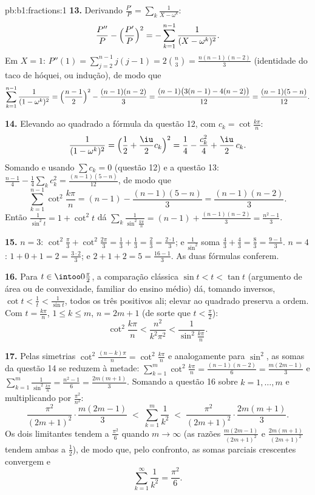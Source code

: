 \begin{solution}{pb:b1:fractions:1}
\textbf{13.} Derivando $\frac{P'}P = \sum_k\frac1{X -
\omega^k}$:
\[
\frac{P''}P - \Bigl(\frac{P'}P\Bigr)^2
= -\sum_{k=1}^{n-1}\frac1{(X - \omega^k)^2} .
\]
Em $X = 1$: $P''(1) = \sum_{j=2}^{n-1}j(j-1) = 2\binom n3 =
\frac{n(n-1)(n-2)}3$ (identidade do taco de hóquei, ou indução), de modo que
\[
\sum_{k=1}^{n-1}\frac1{(1 - \omega^k)^2}
= \Bigl(\frac{n-1}2\Bigr)^2 - \frac{(n-1)(n-2)}3
= \frac{(n-1)\bigl(3(n-1) - 4(n-2)\bigr)}{12}
= \frac{(n-1)(5-n)}{12} .
\]

\textbf{14.} Elevando ao quadrado a fórmula da questão 12, com $c_k =
\cot\frac{k\pi}n$:
\[
\frac1{(1-\omega^k)^2}
= \Bigl(\frac12 + \frac\iu2 c_k\Bigr)^2
= \frac14 - \frac{c_k^2}4 + \frac\iu2\,c_k .
\]
Somando e usando $\sum c_k = 0$ (questão 12) e a questão 13:
$\frac{n-1}4 - \frac14\sum_k c_k^2 = \frac{(n-1)(5-n)}{12}$, de modo que
\[
\sum_{k=1}^{n-1}\cot^2\frac{k\pi}n
= (n-1) - \frac{(n-1)(5-n)}3 = \frac{(n-1)(n-2)}3 .
\]
Então $\frac1{\sin^2t} = 1 + \cot^2t$ dá
$\sum_k\frac1{\sin^2\frac{k\pi}n} = (n-1) +
\frac{(n-1)(n-2)}3 = \frac{n^2-1}3$.

\textbf{15.} $n = 3$: $\cot^2\frac\pi3 + \cot^2\frac{2\pi}3 =
\frac13 + \frac13 = \frac23 = \frac{2\cdot1}3$; e
$\frac1{\sin^2} $ soma $\frac43 + \frac43 = \frac83 =
\frac{9-1}3$. $n = 4$: $1 + 0 + 1 = 2 = \frac{3\cdot2}3$; e $2
+ 1 + 2 = 5 = \frac{16-1}3$. As duas fórmulas conferem.

\textbf{16.} Para $t \in \intoo0{\frac\pi2}$, a comparação clássica
$\sin t < t < \tan t$ (argumento de área ou de convexidade,
familiar do ensino médio) dá, tomando inversos, $\cot t <
\frac1t < \frac1{\sin t}$, todos os três positivos ali; elevar ao quadrado
preserva a ordem. Com $t = \frac{k\pi}n$, $1 \leq k \leq m$,
$n = 2m+1$ (de sorte que $t < \frac\pi2$):
\[
\cot^2\frac{k\pi}n < \frac{n^2}{k^2\pi^2} <
\frac1{\sin^2\frac{k\pi}n} .
\]

\textbf{17.} Pelas simetrias $\cot^2\frac{(n-k)\pi}n =
\cot^2\frac{k\pi}n$ e analogamente para $\sin^2$, as somas da questão 14
se reduzem à metade: $\sum_{k=1}^{m}\cot^2\frac{k\pi}n = \frac{(n-1)(n-2)}6 =
\frac{m(2m-1)}3$ e $\sum_{k=1}^m\frac1{\sin^2\frac{k\pi}n} =
\frac{n^2-1}6 = \frac{2m(m+1)}3$. Somando a questão 16 sobre $k =
1, \dots, m$ e multiplicando por $\frac{\pi^2}{n^2}$:
\[
\frac{\pi^2}{(2m+1)^2}\cdot\frac{m(2m-1)}3
\;<\; \sum_{k=1}^{m}\frac1{k^2} \;<\;
\frac{\pi^2}{(2m+1)^2}\cdot\frac{2m(m+1)}3 .
\]
Os dois limitantes tendem a $\frac{\pi^2}6$ quando $m \to \infty$ (as razões
$\frac{m(2m-1)}{(2m+1)^2}$ e $\frac{2m(m+1)}{(2m+1)^2}$ tendem ambas
a $\frac12$), de modo que, pelo confronto, as somas parciais crescentes
convergem e
\[
\sum_{k=1}^{\infty}\frac1{k^2} = \frac{\pi^2}6 .
\]


\end{solution}
